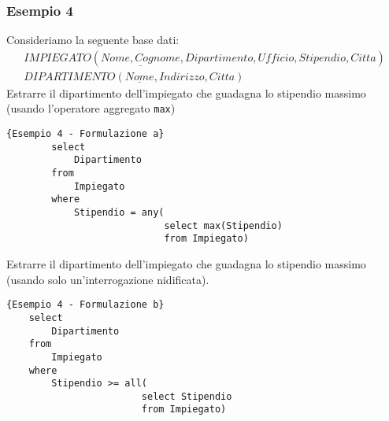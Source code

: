 \subsubsection{Esempio 4}
Consideriamo la seguente base dati:
	\begin{equation}\begin{aligned}
		IMPIEGATO (\underline{Nome, Cognome}, Dipartimento, Ufficio, Stipendio, Citta)\\
		DIPARTIMENTO (\underline{Nome}, Indirizzo, Citta)
	\end{aligned}\end{equation}
Estrarre il dipartimento dell'impiegato che guadagna lo stipendio massimo (usando l'operatore aggregato \texttt{max})
	\begin{lstlisting}{Esempio 4 - Formulazione a}
		select
			Dipartimento
		from	
			Impiegato
		where
			Stipendio = any(
							select max(Stipendio)
				 			from Impiegato)
	\end{lstlisting}
Estrarre il dipartimento dell'impiegato che guadagna lo stipendio massimo (usando solo un'interrogazione nidificata).
	\begin{lstlisting}{Esempio 4 - Formulazione b}
	select
		Dipartimento
	from	
		Impiegato
	where
		Stipendio >= all(
						select Stipendio
						from Impiegato)
	\end{lstlisting}



